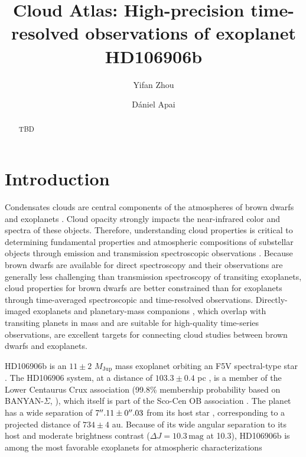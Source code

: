 \documentclass[twocolumn]{aastex62}
\newcommand{\mjup}{\ensuremath{M_\mathrm{Jup}}\xspace}
\begin{document}
\title{Cloud Atlas: High-precision time-resolved observations of exoplanet HD106906b}


\author{Yifan Zhou}

\author{D\'aniel Apai}

\begin{abstract}
TBD
\end{abstract}

\keywords{}
\section{Introduction}

Condensates clouds are central components of the atmospheres of brown dwarfs and exoplanets \citep[e.g.,][]{Morley2012,Marley2013,Marley2015}. Cloud opacity strongly impacts the near-infrared color and spectra of these objects. Therefore, understanding cloud properties is critical to determining  fundamental properties and atmospheric compositions of substellar objects through emission and transmission spectroscopic observations \citep{Ingraham2014, Kreidberg2014a, Stevenson2016, DeWit2016, Samland2017}. Because brown dwarfs are available for direct spectroscopy and their observations are generally less challenging than transmission spectroscopy of transiting exoplanets, cloud properties for brown dwarfs are better constrained than for exoplanets through time-averaged spectroscopic \citep[e.g.,][]{Cushing2008,Stephens2009} and {time-resolved} \citep[e.g.,][]{Buenzli2012,Apai2013,Biller2017,Apai2017} observations. Directly-imaged exoplanets and planetary-mass companions \citep[e.g.,][]{Chauvin2004,Marois2008a,Marois2010,Macintosh2015a}, which overlap with transiting planets in mass and are suitable for high-quality time-series observations, are excellent targets for connecting cloud studies between brown dwarfs and exoplanets.

HD106906b is an $11\pm2$ \mjup{}  mass exoplanet orbiting an F5V spectral-type star \citep{Bailey2013}. The HD106906 system, at a distance of $103.3\pm0.4$ pc \citep{Gaia2016,Gaia2018}, is a member of the Lower Centaurus Crux association (99.8\% membership probability based on BANYAN-$\Sigma$, \citealt{Gagne2018} ), which itself is  part of the Sco-Cen OB association \citep[age: $15\pm3$ Myr,][]{Pecaut2016}. The planet has a wide separation of $7\mbox{$^{\prime\prime}$}.11\pm0\mbox{$^{\prime\prime}$}.03$ from its host star \citep{Bailey2013}, corresponding to a projected distance of $734\pm4$ au. Because of its wide angular separation to its host and moderate brightness contrast ($\Delta J=10.3\,\mathrm{mag}$ at 10.3\arcsec), HD106906b is among the most favorable exoplanets for atmospheric characterizations \citep[e.g., ][]{Bailey2013,Kalas2015,Wu2016,Daemgen2017}
\end{document}
